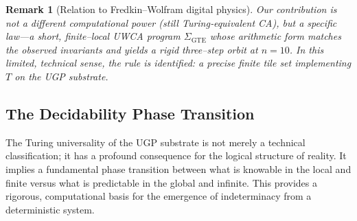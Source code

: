 \documentclass[12pt]{article}
\newtheorem{remark}[theorem]{Remark}
\numberwithin{equation}{section}
\begin{document}

\begin{remark}[Relation to Fredkin–Wolfram digital physics]
Our contribution is not a different computational \emph{power} (still Turing‑equivalent CA), but a specific \emph{law}—a short, finite–local UWCA program \(\Sigma_{\mathrm{GTE}}\) whose arithmetic form matches the observed invariants and yields a rigid three–step orbit at \(n{=}10\). In this limited, technical sense, \emph{the rule} is identified: a precise finite tile set implementing \(T\) on the UGP substrate.
\end{remark}

\subsection{The Decidability Phase Transition}
The Turing universality of the UGP substrate is not merely a technical classification; it has a profound consequence for the logical structure of reality. It implies a fundamental phase transition between what is knowable in the local and finite versus what is predictable in the global and infinite. This provides a rigorous, computational basis for the emergence of indeterminacy from a deterministic system.
\end{document}
